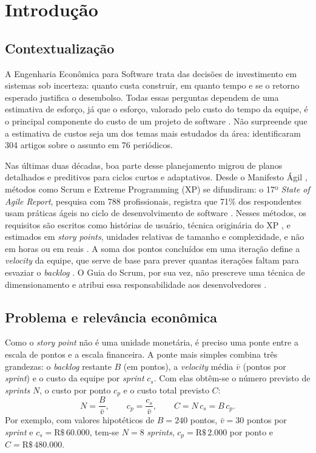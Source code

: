 \section{Introdução}
\label{sec:introducao}

\subsection{Contextualização}

A Engenharia Econômica para Software trata das decisões de investimento em
sistemas sob incerteza: quanto custa construir, em quanto tempo e se o retorno
esperado justifica o desembolso. Todas essas perguntas dependem de uma
estimativa de esforço, já que o esforço, valorado pelo custo do tempo da
equipe, é o principal componente do custo de um projeto de software
\cite{boehm1981}. Não surpreende que a estimativa de custos seja um dos temas
mais estudados da área:  identificaram 304 artigos
sobre o assunto em 76 periódicos.

Nas últimas duas décadas, boa parte desse planejamento migrou de planos
detalhados e preditivos para ciclos curtos e adaptativos. Desde o Manifesto
Ágil \cite{agilemanifesto2001}, métodos como Scrum e Extreme Programming (XP)
se difundiram: o 17º \textit{State of Agile Report}, pesquisa com 788
profissionais, registra que 71\% dos respondentes usam práticas ágeis no ciclo
de desenvolvimento de software \cite{digitalai2024}. Nesses métodos, os
requisitos são escritos como histórias de usuário, técnica originária do XP
\cite{beck2004,cohn2004}, e estimados em \textit{story points}, unidades
relativas de tamanho e complexidade, e não em horas ou em reais
\cite{cohn2005}. A soma dos pontos concluídos em uma iteração define a
\textit{velocity} da equipe, que serve de base para prever quantas iterações
faltam para esvaziar o \textit{backlog} \cite{cohn2005}. O Guia do Scrum, por
sua vez, não prescreve uma técnica de dimensionamento e atribui essa
responsabilidade aos desenvolvedores \cite{scrumguide2020}.

\subsection{Problema e relevância econômica}

Como o \textit{story point} não é uma unidade monetária, é preciso uma ponte
entre a escala de pontos e a escala financeira. A ponte mais simples combina
três grandezas: o \textit{backlog} restante $B$ (em pontos), a \textit{velocity}
média $\bar{v}$ (pontos por \textit{sprint}) e o custo da equipe por
\textit{sprint} $c_s$. Com elas obtêm-se o número previsto de \textit{sprints}
$N$, o custo por ponto $c_p$ e o custo total previsto $C$:
%
\begin{equation}
  N = \frac{B}{\bar{v}}, \qquad
  c_p = \frac{c_s}{\bar{v}}, \qquad
  C = N\,c_s = B\,c_p .
  \label{eq:previsao}
\end{equation}
%
Por exemplo, com valores hipotéticos de $B = 240$ pontos,
$\bar{v} = 30$ pontos por \textit{sprint} e $c_s = \text{R\$}\,60.000$,
tem-se $N = 8$ \textit{sprints}, $c_p = \text{R\$}\,2.000$ por ponto e
$C = \text{R\$}\,480.000$.

